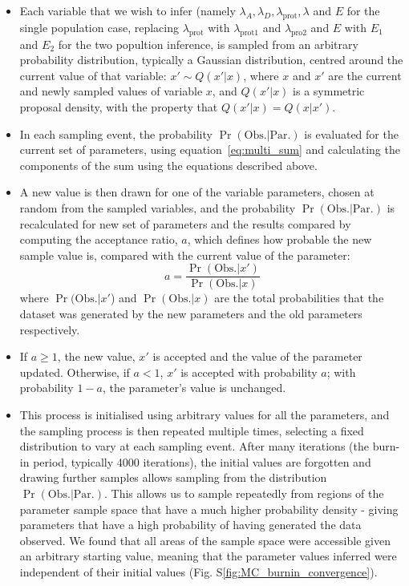 \begin{itemize}
\item Each variable that we wish to infer (namely $\lambda_A, \lambda_D, \lambda_{\text{prot}}, \lambda$ and $E$ for the single population case, replacing $\lambda_{\text{prot}}$ with $\lambda_{\text{prot1}}$ and $\lambda_{\text{pro2}}$ and $E$ with $E_1$ and $E_2$ for the two popultion inference, is sampled from an arbitrary probability distribution, typically a Gaussian distribution, centred around the current value of that variable: $x' \sim Q(x'|x) $, where $x$ and $x'$ are the current and newly sampled values of variable $x$, and $Q(x'|x)$ is a symmetric proposal density, with the property that $Q(x'|x) = Q(x|x')$. 
\item In each sampling event, the probability $\Pr(\text{Obs.} | \text{Par.})$ is evaluated for the current set of parameters, using equation~\ref{eq:multi_sum} and calculating the components of the sum using the equations described above.  

\item A new value is then drawn for one of the variable parameters, chosen at random from the sampled variables, and the probability $\Pr(\text{Obs.} | \text{Par.})$ is recalculated for new set of parameters and the results compared by computing the acceptance ratio, $a$, which defines how probable the new sample value is, compared with the current value of the parameter:
\begin{equation}
a = \frac{\Pr(\text{Obs.} | x')}{\Pr(\text{Obs.} | x)}
\end {equation}
where $\Pr(\text{Obs.} | x'$) and $\Pr(\text{Obs.} | x)$ are the total probabilities that the dataset was generated by the new parameters and the old parameters respectively.
\item  If $a \ge 1$, the new value, $x'$ is accepted and the value of the parameter updated.  Otherwise, if $a < 1$, $x'$ is accepted with probability $a$; with probability $1 - a$, the parameter's value is unchanged.
\item This process is initialised using arbitrary values for all the parameters, and the sampling process is then repeated multiple times, selecting a fixed distribution to vary at each sampling event. After many iterations (the burn-in period, typically 4000 iterations), the initial values are forgotten and drawing further samples allows sampling from the distribution $\Pr(\text{Obs.} | \text{Par.})$.  This allows us to sample repeatedly from regions of the parameter sample space that have a much higher probability density - giving parameters that have a high probability of having generated the data observed. We found that all areas of the sample space were accessible given an arbitrary starting value, meaning that the parameter values inferred were independent of their initial values (Fig. S\ref{fig:MC_burnin_convergence}).
\end{itemize}


